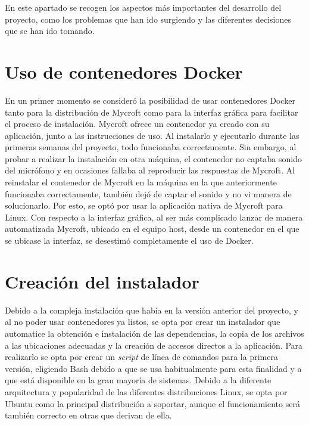 
En este apartado se recogen los aspectos más importantes del desarrollo del proyecto, como los problemas que han ido surgiendo y las diferentes decisiones que se han ido tomando.

\section{Uso de contenedores Docker}
En un primer momento se consideró la posibilidad de usar contenedores Docker tanto para la distribución de Mycroft como para la interfaz gráfica para facilitar el proceso de instalación.
Mycroft ofrece un contenedor ya creado con su aplicación, junto a las instrucciones de uso. Al instalarlo y ejecutarlo durante las primeras semanas del proyecto, todo funcionaba correctamente. Sin embargo, al probar a realizar la instalación en otra máquina, el contenedor no captaba sonido del micrófono y en ocasiones fallaba al reproducir las respuestas de Mycroft. Al reinstalar el contenedor de Mycroft en la máquina en la que anteriormente funcionaba correctamente, también dejó de captar el sonido y no vi manera de solucionarlo. Por esto, se optó por usar la aplicación nativa de Mycroft para Linux.
Con respecto a la interfaz gráfica, al ser más complicado lanzar de manera automatizada Mycroft, ubicado en el equipo host, desde un contenedor en el que se ubicase la interfaz, se desestimó completamente el uso de Docker.

\section{Creación del instalador}
Debido a la compleja instalación que había en la versión anterior del proyecto, y al no poder usar contenedores ya listos, se opta por crear un instalador que automatice la obtención e instalación de las dependencias, la copia de los archivos a las ubicaciones adecuadas y la creación de accesos directos a la aplicación. Para realizarlo se opta por crear un \textit{script} de línea de comandos para la primera versión, eligiendo Bash debido a que se usa habitualmente para esta finalidad y a que está disponible en la gran mayoría de sistemas. Debido a la diferente arquitectura y popularidad de las diferentes distribuciones Linux, se opta por Ubuntu como la principal distribución a soportar, aunque el funcionamiento será también correcto en otras que derivan de ella.

